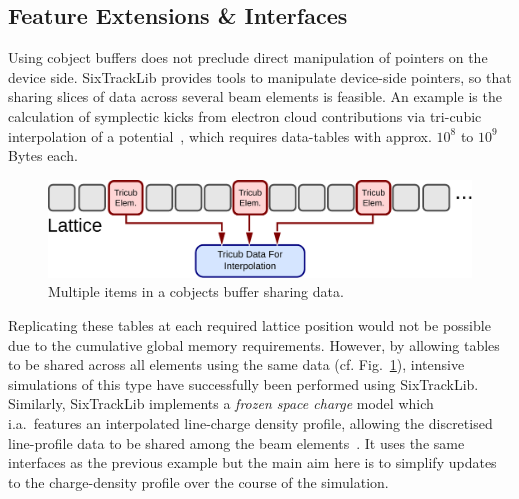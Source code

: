\documentclass[a4paper,
               refpage,       %
               keeplastbox,   %
               ]{jacow}
\begin{document}
\subsection{Feature Extensions \& Interfaces}
Using cobject buffers does not preclude direct manipulation of pointers on the device side. SixTrackLib provides tools to manipulate device-side pointers, so that sharing slices of data across several beam elements is feasible. An example is the calculation of symplectic kicks from electron cloud contributions via tri-cubic interpolation of a potential~\cite{kparaschou-2020}, which requires data-tables with approx. $10^8$ to $10^9$ Bytes each. 
\begin{figure}[!hbt]
    \centering
    \includegraphics*[width=.9\columnwidth]{fig_be_external_data}
    \caption{Multiple items in a cobjects buffer sharing data.}
    \label{fig:be_external_data}
\end{figure}
Replicating these tables at each required lattice position would not be possible due to the cumulative global memory requirements. However, by allowing tables to be shared across all elements using the same data (cf. Fig.~\ref{fig:be_external_data}), intensive simulations of this type have successfully been performed using SixTrackLib.
Similarly, SixTrackLib implements a \textit{frozen space charge} model which i.a.\ features an interpolated line-charge density profile, allowing the discretised line-profile data to be shared among the beam elements~\cite{aoeftiger-2021}. It uses the same interfaces as the previous example but the main aim here is to simplify updates to the charge-density profile over the course of the simulation.
\end{document}
